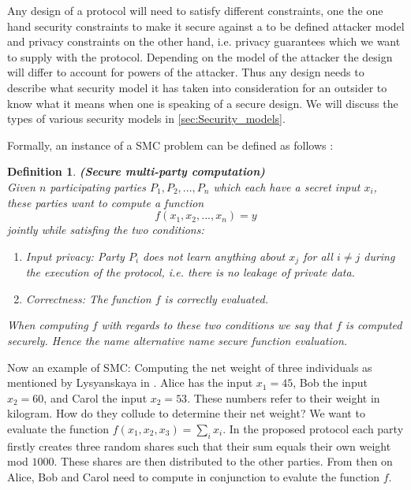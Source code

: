 \documentclass[12pt,a4paper]{scrartcl}				%
\begin{document}
Any design of a protocol will need to satisfy different constraints, one the one hand security constraints to make it secure against a to be defined attacker model and privacy constraints on the other hand, i.e. privacy guarantees which we want to supply with the protocol. Depending on the model of the attacker the design will differ to account for powers of the attacker. Thus any design needs to describe what security model it has taken into consideration for an outsider to know what it means when one is speaking of a secure design. We will discuss the types of various security models in \ref{sec:Security_models}.

Formally, an instance of a SMC problem can be defined as follows \cite[p.6]{Cramer}:
\newtheorem{mydef}{Definition}
\label{SMC}
\begin{mydef}
	\textbf{(Secure multi-party computation)}\\
	Given $n$ participating parties $P_1,P_2,...,P_n$ which each have a secret input $x_i$, these parties want to compute a function
	\begin{equation*}
	f(x_1,x_2,...,x_n)=y
	\end{equation*}
	jointly while satisfing the two conditions:
	\begin{enumerate}
		\item Input privacy: Party $P_i$ does not learn anything about $x_j$ for all $i\neq j$ during the execution of the protocol, i.e. there is no leakage of private data.
		\item Correctness: The function $f$ is correctly evaluated.
	\end{enumerate}
	When computing $f$ with regards to these two conditions we say that $f$ is computed \textit{securely}. Hence the name alternative name secure function evaluation.
\end{mydef}

Now an example of SMC: Computing the net weight of three individuals as mentioned by Lysyanskaya in \cite{lysyanskaya2008keep}. Alice has the input $x_1=45$, Bob the input $x_2=60$, and Carol the input $x_2=53$. These numbers refer to their weight in kilogram. How do they collude to determine their net weight? We want to evaluate the function $f(x_1,x_2,x_3)=\sum_i x_i$. In the proposed protocol each party firstly creates three random shares such that their sum equals their own weight mod $1000$. These shares are then distributed to the other parties. From then on Alice, Bob and Carol need to compute in conjunction to evalute the function $f$.
\end{document}
